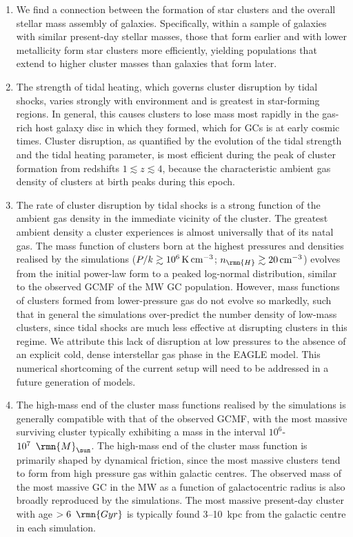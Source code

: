 \documentclass[fleqn,usenatbib]{mnras}
\newcommand\Msun{\,\rmn{M}_{\sun}}
\newcommand\Gyr{\,\rmn{Gyr}}
\newcommand{\K}              {\,{\rm K}}
\newcommand{\cmcubed}              {\,{\rm cm}^{-3}}
\begin{document}
\begin{enumerate}
\item We find a connection between the formation of star clusters and the overall stellar mass assembly of galaxies. Specifically, within a sample of galaxies with similar present-day stellar masses, those that form earlier and with lower metallicity form star clusters more efficiently, yielding populations that extend to higher cluster masses than galaxies that form later.

\item The strength of tidal heating, which governs cluster disruption by tidal shocks, varies strongly with environment and is greatest in star-forming regions. In general, this causes clusters to lose mass most rapidly in the gas-rich host galaxy disc in which they formed, which for GCs is at early cosmic times. Cluster disruption, as quantified by the evolution of the tidal strength and the tidal heating parameter, is most efficient during the peak of cluster formation from redshifts $1 \lesssim z \lesssim 4$, because the characteristic ambient gas density of clusters at birth peaks during this epoch.

\item The rate of cluster disruption by tidal shocks is a strong function of the ambient gas density in the immediate vicinity of the cluster. The greatest ambient density a cluster experiences is almost universally that of its natal gas. The mass function of clusters born at the highest pressures and densities realised by the simulations ($P/k \gtrsim 10^6 \K \cmcubed$; $n_\rmn{H} \gtrsim 20 \cmcubed$) evolves from the initial power-law form to a peaked log-normal distribution, similar to the observed GCMF of the MW GC population. However, mass functions of clusters formed from lower-pressure gas do not evolve so markedly, such that in general the simulations over-predict the number density of low-mass clusters, since tidal shocks are much less effective at disrupting clusters in this regime. We attribute this lack of disruption at low pressures to the absence of an explicit cold, dense interstellar gas phase in the EAGLE model. This numerical shortcoming of the current setup will need to be addressed in a future generation of models.

\item The high-mass end of the cluster mass functions realised by the simulations is generally compatible with that of the observed GCMF, with the most massive surviving cluster typically exhibiting a mass in the interval $10^6$-$10^7~\Msun$. The high-mass end of the cluster mass function is primarily shaped by dynamical friction, since the most massive clusters tend to form from high pressure gas within galactic centres. The observed mass of the most massive GC in the MW as a function of galactocentric radius is also broadly reproduced by the simulations. The most massive present-day cluster with age $>6~\Gyr$ is typically found 3--10~kpc from the galactic centre in each simulation.


\end{enumerate}
\end{document}
